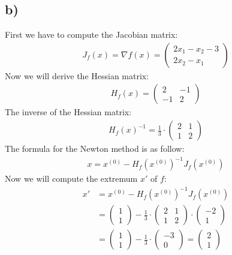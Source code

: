 \documentclass[a4paper]{article}
\begin{document}
    \subsection*{b)}
        First we have to compute the Jacobian matrix:
        \begin{align}
            J_f(x) = \nabla f(x) = \left( \begin{matrix} 2x_1 - x_2 -3 \\ 2x_2 - x_1 \end{matrix} \right)
        \end{align}
        Now we will derive the Hessian matrix:
        \begin{align}
            H_f(x) = \left( \begin{matrix} 2 & -1 \\ -1 & 2 \end{matrix} \right)
        \end{align}
        The inverse of the Hessian matrix:
        \begin{align}
            H_f(x)^{-1} = \frac{1}{3} \cdot \left( \begin{matrix} 2 & 1 \\ 1 & 2 \end{matrix} \right)
        \end{align}
        The formula for the Newton method is as follow:
        \begin{align}
            x = x^{(0)} - H_f(x^{(0)})^{-1} J_f(x^{(0)})
        \end{align}
        Now we will compute the extremum $x'$ of $f$:
        \begin{align}
            x' &= x^{(0)} - H_f(x^{(0)})^{-1} J_f(x^{(0)})\\
            &= \left( \begin{matrix} 1 \\ 1 \end{matrix} \right) - \frac{1}{3} \cdot \left( \begin{matrix} 2 & 1 \\ 1 & 2 \end{matrix} \right) \cdot \left( \begin{matrix} -2 \\ 1 \end{matrix} \right)\\
            &= \left( \begin{matrix} 1 \\ 1 \end{matrix} \right) - \frac{1}{3} \cdot \left( \begin{matrix} -3 \\ 0 \end{matrix} \right)
            = \left( \begin{matrix} 2 \\ 1 \end{matrix} \right)
        \end{align}
\end{document}
